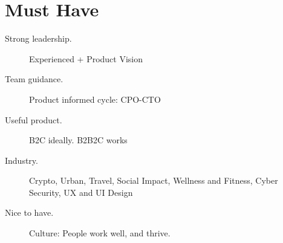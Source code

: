\documentclass[10pt, a4paper, twocolumn]{article}
\begin{document}
\section*{Must Have}

\begin{description}
 \item[Strong leadership.] Experienced + Product Vision
  \item[Team guidance.] Product informed cycle: CPO-CTO
 \item[Useful product.] B2C ideally. B2B2C works
  \item[Industry.]
  Crypto,
  Urban,
  Travel,
  Social Impact,
  Wellness and Fitness,
  Cyber Security,
  UX and UI Design \\
  \item[Nice to have.]
 Culture: People work well, %
 and thrive.
\end{description}














%
\end{document}
